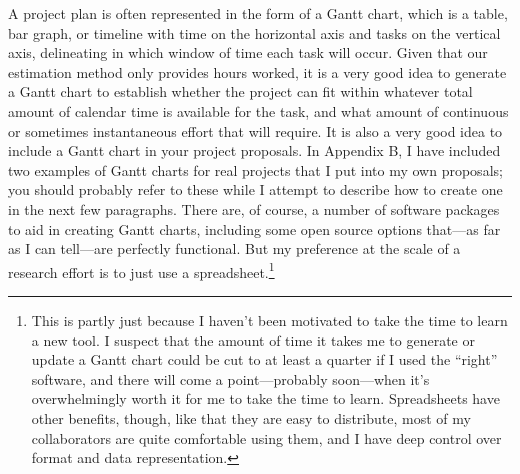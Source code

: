 \documentclass[12pt,oneside]{book}
\begin{document}
A project plan is often represented in the form of a Gantt chart, which is a table, bar graph, or timeline with time on the horizontal axis and tasks on the vertical axis, delineating in which window of time each task will occur. Given that our estimation method only provides hours worked, it is a very good idea to generate a Gantt chart to establish whether the project can fit within whatever total amount of calendar time is available for the task, and what amount of continuous or sometimes instantaneous effort that will require. It is also a very good idea to include a Gantt chart in your project proposals. In Appendix B, I have included two examples of Gantt charts for real projects that I put into my own proposals; you should probably refer to these while I attempt to describe how to create one in the next few paragraphs. There are, of course, a number of software packages to aid in creating Gantt charts, including some open source options that---as far as I can tell---are perfectly functional. But my preference at the scale of a research effort is to just use a spreadsheet.\footnote{
This is partly just because I haven't been motivated to take the time to learn a new tool. I suspect that the amount of time it takes me to generate or update a Gantt chart could be cut to at least a quarter if I used the ``right'' software, and there will come a point—probably soon—when it's overwhelmingly worth it for me to take the time to learn. Spreadsheets have other benefits, though, like that they are easy to distribute, most of my collaborators are quite comfortable using them, and I have deep control over format and data representation.}
	
\end{document}
